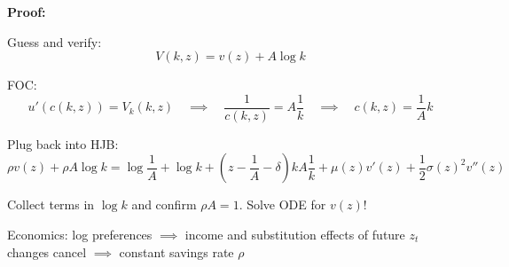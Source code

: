 \documentclass[11pt, aspectratio=169]{beamer}
\newenvironment{witemize}{\itemize\addtolength{\itemsep}{10pt}}{\enditemize}
\begin{document}
\begin{frame}{}
\textbf{Proof:}
\begin{witemize}
\item Guess and verify:
\begin{equation*}
	V(k, z) = v(z) + A \log k
\end{equation*}

\item FOC: 
\begin{equation*}
	u'(c(k, z)) = V_k(k, z) 
	\quad \implies \quad
	\frac{1}{c(k, z)} = A \frac{1}{k}
	\quad \implies \quad
	c(k, z) = \frac{1}{A} k
\end{equation*}

\item Plug back into HJB: 
\begin{equation*}
\rho v(z) + \rho A \log k = \log \frac{1}{A} + \log k + (z - \frac{1}{A} - \delta) k A \frac{1}{k} + \mu(z) v'(z) + \frac{1}{2} \sigma(z)^2 v''(z)
\end{equation*}

\item Collect terms in $\log k$ and confirm $\rho A = 1$. Solve ODE for $v(z)$!

\item Economics: log preferences $\implies$ income and substitution effects of future $z_t$ changes cancel $\implies$ constant savings rate $\rho$
\end{witemize}
\end{frame}
\end{document}
